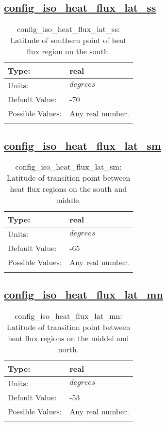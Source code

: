 \subsection[config\_iso\_heat\_flux\_lat\_ss]{\hyperref[sec:nm_tab_iso]{config\_iso\_heat\_flux\_lat\_ss}}
\label{subsec:nm_sec_config_iso_heat_flux_lat_ss}
\begin{center}
\begin{longtable}{| p{2.0in} || p{4.0in} |}
    \hline
    Type: & real \\
    \hline
    Units: & $degrees$ \\
    \hline
    Default Value: & -70 \\
    \hline
    Possible Values: & Any real number. \\
    \hline
    \caption{config\_iso\_heat\_flux\_lat\_ss: Latitude of southern point of heat flux region on the south.}
\end{longtable}
\end{center}
\subsection[config\_iso\_heat\_flux\_lat\_sm]{\hyperref[sec:nm_tab_iso]{config\_iso\_heat\_flux\_lat\_sm}}
\label{subsec:nm_sec_config_iso_heat_flux_lat_sm}
\begin{center}
\begin{longtable}{| p{2.0in} || p{4.0in} |}
    \hline
    Type: & real \\
    \hline
    Units: & $degrees$ \\
    \hline
    Default Value: & -65 \\
    \hline
    Possible Values: & Any real number. \\
    \hline
    \caption{config\_iso\_heat\_flux\_lat\_sm: Latitude of transition point between heat flux regions on the south and middle.}
\end{longtable}
\end{center}
\subsection[config\_iso\_heat\_flux\_lat\_mn]{\hyperref[sec:nm_tab_iso]{config\_iso\_heat\_flux\_lat\_mn}}
\label{subsec:nm_sec_config_iso_heat_flux_lat_mn}
\begin{center}
\begin{longtable}{| p{2.0in} || p{4.0in} |}
    \hline
    Type: & real \\
    \hline
    Units: & $degrees$ \\
    \hline
    Default Value: & -53 \\
    \hline
    Possible Values: & Any real number. \\
    \hline
    \caption{config\_iso\_heat\_flux\_lat\_mn: Latitude of transition point between heat flux regions on the middel and north.}
\end{longtable}
\end{center}

